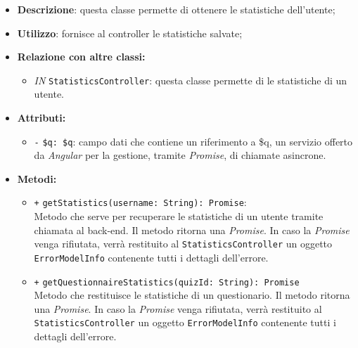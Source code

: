 \begin{itemize}
	\item \textbf{Descrizione}: questa classe permette di ottenere le statistiche dell'utente;
	\item \textbf{Utilizzo}: fornisce al controller le statistiche salvate;
	\item \textbf{Relazione con altre classi:}
	\begin{itemize}
		\item \textit{IN} \texttt{StatisticsController}: questa classe permette di le statistiche di un utente.
	\end{itemize}
	\item \textbf{Attributi:}
	\begin{itemize}
		\item \texttt{-} \texttt{\$q: \$q}: campo dati che contiene un riferimento a \$q, un servizio offerto da \textit{Angular} per la gestione, tramite \textit{Promise}, di chiamate asincrone.
	\end{itemize}
	\item \textbf{Metodi:}
	\begin{itemize}
		\item \texttt{+} \texttt{getStatistics(username: String): Promise}: \\Metodo che serve per recuperare le statistiche di un utente tramite chiamata al back-end. Il metodo ritorna una \textit{Promise}. In caso la \textit{Promise} venga rifiutata, verrà restituito al \texttt{StatisticsController} un oggetto \texttt{ErrorModelInfo} contenente tutti i dettagli dell'errore. \\
		\item \texttt{+} \texttt{getQuestionnaireStatistics(quizId: String): Promise} \\Metodo che restituisce le statistiche di un questionario.  Il metodo ritorna una \textit{Promise}. In caso la \textit{Promise} venga rifiutata, verrà restituito al \texttt{StatisticsController} un oggetto \texttt{ErrorModelInfo} contenente tutti i dettagli dell'errore. \\
	\end{itemize}
\end{itemize}


